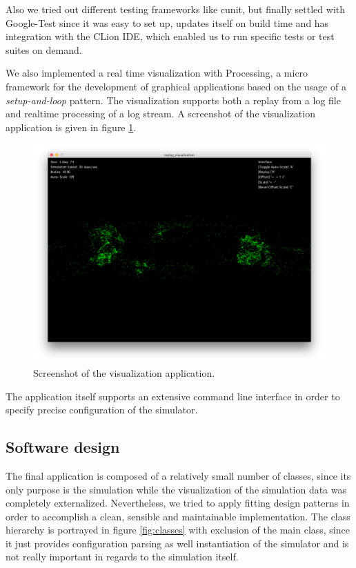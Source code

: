 \documentclass[a4paper,11pt]{scrartcl} %
\begin{document}
Also we tried out different testing frameworks like cunit, but finally settled with Google-Test \cite{gtest} since it was easy to set up, updates itself on build time and has integration with the CLion IDE, which enabled us to run specific tests or test suites on demand.

We also implemented a real time visualization with Processing, a micro framework for the development of graphical applications based on the usage of a \textit{setup-and-loop} pattern. The visualization supports both a replay from a log file and realtime processing of a log stream. A screenshot of the visualization application is given in figure \ref{fig:vis_app}.

\begin{figure}[h!]
  \centering
  \includegraphics[width=\textwidth]{img/visualization.png}
  \caption{Screenshot of the visualization application.}
  \label{fig:vis_app}
\end{figure}

The application itself supports an extensive command line interface in order to specify precise configuration of the simulator.

\subsection{Software design}
\label{software_design}
The final application is composed of a relatively small number of classes, since its only purpose is the simulation while the visualization of the simulation data was completely externalized. Nevertheless, we tried to apply fitting design patterns in order to accomplish a clean, sensible and maintainable implementation. The class hierarchy is portrayed in figure \ref{fig:classes} with exclusion of the main class, since it just provides configuration parsing as well instantiation of the simulator and is not really important in regards to the simulation itself.
\end{document}
